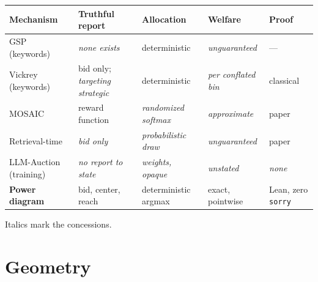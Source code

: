 {\def\LTcaptype{none} %
\begin{longtable}[]{@{}
  >{\raggedright\arraybackslash}p{}
  >{\raggedright\arraybackslash}p{}
  >{\raggedright\arraybackslash}p{}
  >{\raggedright\arraybackslash}p{}
  >{\raggedright\arraybackslash}p{}@{}}
\toprule\noalign{}
\begin{minipage}[b]{\linewidth}\raggedright
Mechanism
\end{minipage} & \begin{minipage}[b]{\linewidth}\raggedright
Truthful report
\end{minipage} & \begin{minipage}[b]{\linewidth}\raggedright
Allocation
\end{minipage} & \begin{minipage}[b]{\linewidth}\raggedright
Welfare
\end{minipage} & \begin{minipage}[b]{\linewidth}\raggedright
Proof
\end{minipage} \\
\midrule\noalign{}
\endhead
\bottomrule\noalign{}
\endlastfoot
GSP (keywords) & \emph{none exists} & deterministic &
\emph{unguaranteed} & --- \\
Vickrey (keywords) & bid only; \emph{targeting strategic} &
deterministic & \emph{per conflated bin} & classical \\
MOSAIC & reward function & \emph{randomized softmax} &
\emph{approximate} & paper \\
Retrieval-time & \emph{bid only} & \emph{probabilistic draw} &
\emph{unguaranteed} & paper \\
LLM-Auction (training) & \emph{no report to state} & \emph{weights,
opaque} & \emph{unstated} & \emph{none} \\
\textbf{Power diagram} & bid, center, reach & deterministic argmax &
exact, pointwise & Lean, zero \texttt{sorry} \\
\end{longtable}
}

Italics mark the concessions.

\section{Geometry}\label{geometry}

